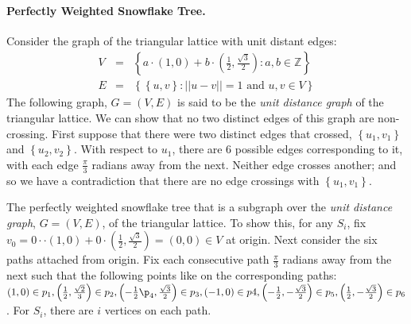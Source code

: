 \documentclass[10pt]{CSUNthesis}
\theoremstyle{plain}%
\theoremstyle{definition}
\theoremstyle{remark}
\newcommand{\bbZ}{{\mathbb{Z}}}
\newcommand{\lr}[1]{\left( #1 \right)}
\begin{document}
\paragraph{Perfectly Weighted Snowflake Tree.}

Consider the graph of the triangular lattice with unit distant edges:
\begin{eqnarray*}
V &=& \left\lbrace a\cdot (1,0) + b \cdot \left(\frac{1}{2},\frac{\sqrt{3}}{2}\right) : a,b \in \bbZ \right\rbrace\\
E &=& \left\lbrace \left\lbrace u,v \right\rbrace : \vert\vert u-v \vert\vert = 1 \text{ and } u,v \in V\right\rbrace
\end{eqnarray*}
The following graph, $G=(V,E)$ is said to be the \textit{unit distance graph} of the triangular lattice.  
We can show that no two distinct edges of this graph are non-crossing.  
First suppose that there were two distinct edges that crossed, $\left\lbrace u_1,v_1 \right\rbrace $ and $\left\lbrace u_2,v_2 \right\rbrace$.  
With respect to $u_1$, there are 6 possible edges corresponding to it, with each edge $\frac{\pi}{3}$ radians away from the next.  
Neither edge crosses another; and so we have a contradiction that there are no edge crossings with $\left\lbrace u_1,v_1 \right\rbrace $.  


The perfectly weighted snowflake tree that is a subgraph over the \textit{unit distance graph}, $G=(V,E)$, of the triangular lattice.  
To show this, for any $S_i$, fix $v_0 = 0 \cdot \cdot (1,0) + 0 \cdot \left(\frac{1}{2},\frac{\sqrt{3}}{2}\right)=\lr{0,0} \in V$ at origin.  
Next consider the six paths attached from origin.  
Fix each consecutive path $\frac{\pi}{3}$ radians away from the next such that the following points like on the corresponding paths: $\lr{1,0} \in p_1, \lr{\frac{1}{2} ,\frac{\sqrt{2}}{3}} \in p_2,\lr{-\frac{1}{2}\p_4,\frac{\sqrt{3}}{2}} \in p_3, \lr{-1,0} \in p4, \lr{-\frac{1}{2},-\frac{\sqrt{3}}{2}}\in p_5,\lr{\frac{1}{2},-\frac{\sqrt{3}}{2}}\in p_6$.  
For $S_i$, there are $i$ vertices on each path.  
\end{document}
